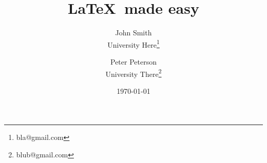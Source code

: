 \documentclass[10pt, a4paper]{article}
\begin{document}
\title{\LaTeX\ made easy}

\author{John Smith\\University Here\thanks{bla@gmail.com} \and Peter Peterson\\University There\thanks{blub@gmail.com}}

\date{\today}

\maketitle


\newpage

\blindtext
\end{document}
